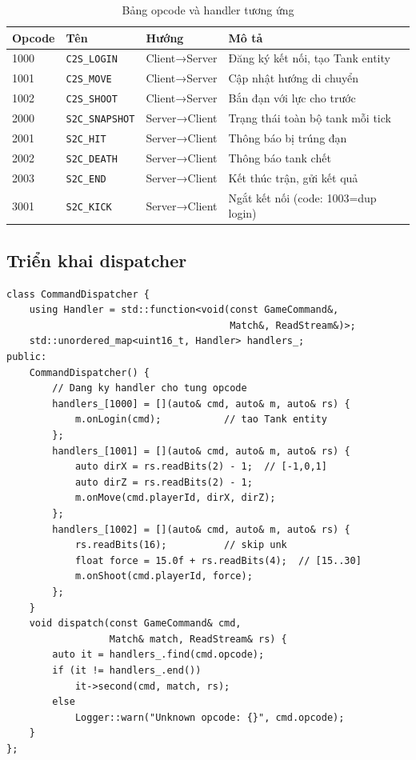 \documentclass[12pt,a4paper]{report}
\begin{document}
\begin{table}[H]
\centering
\caption{Bảng opcode và handler tương ứng}
\label{tab:opcodes}
\begin{tabularx}{\textwidth}{lllX}
\toprule
\textbf{Opcode} & \textbf{Tên} & \textbf{Hướng} & \textbf{Mô tả} \\
\midrule
1000 & \texttt{C2S\_LOGIN}    & Client→Server & Đăng ký kết nối, tạo Tank entity \\
1001 & \texttt{C2S\_MOVE}     & Client→Server & Cập nhật hướng di chuyển \\
1002 & \texttt{C2S\_SHOOT}    & Client→Server & Bắn đạn với lực cho trước \\
2000 & \texttt{S2C\_SNAPSHOT} & Server→Client & Trạng thái toàn bộ tank mỗi tick \\
2001 & \texttt{S2C\_HIT}      & Server→Client & Thông báo bị trúng đạn \\
2002 & \texttt{S2C\_DEATH}    & Server→Client & Thông báo tank chết \\
2003 & \texttt{S2C\_END}      & Server→Client & Kết thúc trận, gửi kết quả \\
3001 & \texttt{S2C\_KICK}     & Server→Client & Ngắt kết nối (code: 1003=dup login) \\
\bottomrule
\end{tabularx}
\end{table}

\subsection{Triển khai dispatcher}

\begin{lstlisting}[style=cppStyle, caption={CommandDispatcher --- đăng ký và gọi handler}, label={lst:dispatcher}]
class CommandDispatcher {
    using Handler = std::function<void(const GameCommand&,
                                       Match&, ReadStream&)>;
    std::unordered_map<uint16_t, Handler> handlers_;
public:
    CommandDispatcher() {
        // Dang ky handler cho tung opcode
        handlers_[1000] = [](auto& cmd, auto& m, auto& rs) {
            m.onLogin(cmd);           // tao Tank entity
        };
        handlers_[1001] = [](auto& cmd, auto& m, auto& rs) {
            auto dirX = rs.readBits(2) - 1;  // [-1,0,1]
            auto dirZ = rs.readBits(2) - 1;
            m.onMove(cmd.playerId, dirX, dirZ);
        };
        handlers_[1002] = [](auto& cmd, auto& m, auto& rs) {
            rs.readBits(16);          // skip unk
            float force = 15.0f + rs.readBits(4);  // [15..30]
            m.onShoot(cmd.playerId, force);
        };
    }
    void dispatch(const GameCommand& cmd,
                  Match& match, ReadStream& rs) {
        auto it = handlers_.find(cmd.opcode);
        if (it != handlers_.end())
            it->second(cmd, match, rs);
        else
            Logger::warn("Unknown opcode: {}", cmd.opcode);
    }
};
\end{lstlisting}
\end{document}
